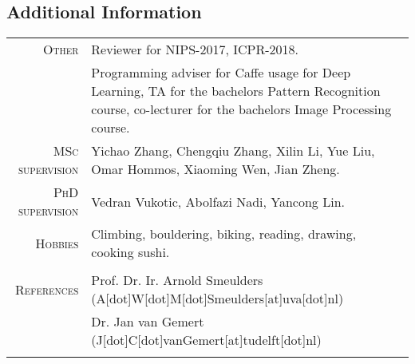 \documentclass[a4paper, oneside, final]{scrartcl}
\begin{document}
\begin{center}
		\section{Additional Information}
		\begin{tabular}{r@{\hskip 0.3in}p{11.3cm}}
			\textsc{Other}			 &  Reviewer for NIPS-2017, ICPR-2018.\\
									 &	Programming adviser for Caffe usage for Deep Learning, TA for the bachelors Pattern Recognition course, co-lecturer for the bachelors Image Processing course.\\
			\textsc{MSc supervision} & Yichao Zhang, Chengqiu Zhang, Xilin Li, Yue Liu, Omar Hommos, Xiaoming Wen, Jian Zheng.\\
			\textsc{PhD supervision} & Vedran Vukotic, Abolfazi Nadi, Yancong Lin.\\[5px] 
			\textsc{Hobbies}		 & Climbing, bouldering, biking, reading, drawing, cooking sushi.\\					 
			\multicolumn{2}{c}{}\\

			\textsc{References} & Prof. Dr. Ir. Arnold Smeulders (A[dot]W[dot]M[dot]Smeulders[at]uva[dot]nl)\\
								& Dr. Jan van Gemert (J[dot]C[dot]vanGemert[at]tudelft[dot]nl)\\[5px]	
			\multicolumn{2}{c}{}\\
		\end{tabular}
	\end{center}
\end{document}
